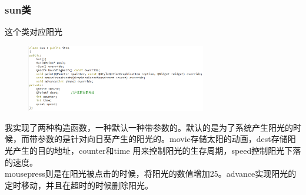 \documentclass[12pt,a4paper,UTF8]{article}
\begin{document}
    \subsubsection{sun类}
    这个类对应阳光
    \begin{figure}[H]
      \centering
    \includegraphics[width=0.7\textwidth]{figure/sun.png}
    \end{figure}
    我实现了两种构造函数，一种默认一种带参数的。默认的是为了系统产生阳光的时候，而带参数的是针对向日葵产生的阳光的。movie存储太阳的动画，dest存储阳光产生的目的地址，counter和time
    用来控制阳光的生存周期，speed控制阳光下落的速度。\\
    mousepress则是在阳光被点击的时候，将阳光的数值增加25。advance实现阳光的定时移动，并且在超时的时候删除阳光。
\end{document}
